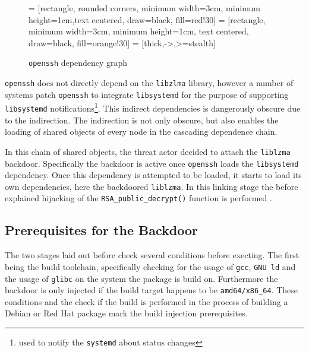 \begin{figure}[H]
    \centering

     = [rectangle, rounded corners, minimum width=3cm, minimum height=1cm,text centered, draw=black, fill=red!30]
     = [rectangle, minimum width=3cm, minimum height=1cm, text centered, draw=black, fill=orange!30]
     = [thick,->,>=stealth]
    \label{chart:dependecies}
    \caption{\texttt{openssh} dependency graph}
\end{figure}

\texttt{openssh} does not directly depend on the \texttt{libzlma} library,
however a number of systems patch \texttt{openssh} to integrate
\texttt{libsystemd} for the purpose of supporting \texttt{libsystemd}
notifications\footnote{used to notify the \texttt{systemd} about status
changes}. This indirect dependencies is dangerously obscure due to the
indirection. The indirection is not only obscure, but also enables the loading
of shared objects of every node in the cascading dependence chain. 

In this chain of shared objects, the threat actor decided to attach the
\texttt{liblzma} backdoor. Specifically the backdoor is active once
\texttt{openssh} loads the \texttt{libsystemd} dependency. Once this dependency
is attempted to be loaded, it starts to load its own dependencies, here the
backdoored \texttt{liblzma}. In this linking stage the before explained
hijacking of the \texttt{RSA\_public\_decrypt()} function is performed
\cite{arstechnica2024xzutils, github2024commit}.

\subsection{Prerequisites for the Backdoor}

The two stages laid out before check several conditions before execting. The
first being the build toolchain, specifically checking for the usage of
\texttt{gcc}, \texttt{GNU ld} and the usage of \texttt{glibc} on the system
the package is build on. Furthermore the backdoor is only injected if the
build target happens to be \texttt{amd64/x86\_64}. These conditions and the
check if the build is performed in the process of building a Debian or Red
Hat package mark the build injection prerequisites.

